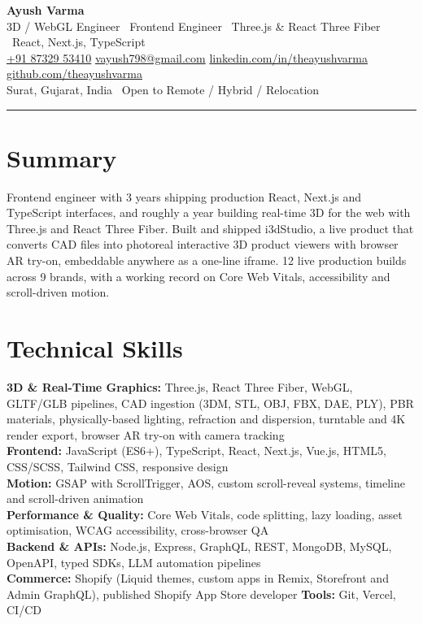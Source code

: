 \documentclass[10pt]{article}
\newcommand{\myphone}{\href{https://wa.me/918732953410}{+91 87329 53410}}
\begin{document}
\pagestyle{empty}

\begin{center}
{\Huge \bfseries Ayush Varma}\\[3pt]
{\small\color{textgray}
  3D / WebGL Engineer \textbullet\ Frontend Engineer \textbullet\ Three.js \& React Three Fiber \textbullet\ React, Next.js, TypeScript
}\\[3pt]
{\small
  \myphone \quad
  \href{mailto:vayush798@gmail.com}{vayush798@gmail.com} \quad
  \href{https://linkedin.com/in/theayushvarma}{linkedin.com/in/theayushvarma} \quad
  \href{https://github.com/theayushvarma}{github.com/theayushvarma}
}\\[2pt]
{\small Surat, Gujarat, India \textbullet\ Open to Remote / Hybrid / Relocation}
\end{center}

\hrule

\section*{Summary}
Frontend engineer with 3 years shipping production React, Next.js and TypeScript interfaces, and roughly a year building real-time 3D for the web with Three.js and React Three Fiber. Built and shipped i3dStudio, a live product that converts CAD files into photoreal interactive 3D product viewers with browser AR try-on, embeddable anywhere as a one-line iframe. 12 live production builds across 9 brands, with a working record on Core Web Vitals, accessibility and scroll-driven motion.

\section*{Technical Skills}
\textbf{3D \& Real-Time Graphics:} Three.js, React Three Fiber, WebGL, GLTF/GLB pipelines, CAD ingestion (3DM, STL, OBJ, FBX, DAE, PLY), PBR materials, physically-based lighting, refraction and dispersion, turntable and 4K render export, browser AR try-on with camera tracking \\
\textbf{Frontend:} JavaScript (ES6+), TypeScript, React, Next.js, Vue.js, HTML5, CSS/SCSS, Tailwind CSS, responsive design \\
\textbf{Motion:} GSAP with ScrollTrigger, AOS, custom scroll-reveal systems, timeline and scroll-driven animation \\
\textbf{Performance \& Quality:} Core Web Vitals, code splitting, lazy loading, asset optimisation, WCAG accessibility, cross-browser QA \\
\textbf{Backend \& APIs:} Node.js, Express, GraphQL, REST, MongoDB, MySQL, OpenAPI, typed SDKs, LLM automation pipelines \\
\textbf{Commerce:} Shopify (Liquid themes, custom apps in Remix, Storefront and Admin GraphQL), published Shopify App Store developer \quad \textbf{Tools:} Git, Vercel, CI/CD \\
\end{document}
